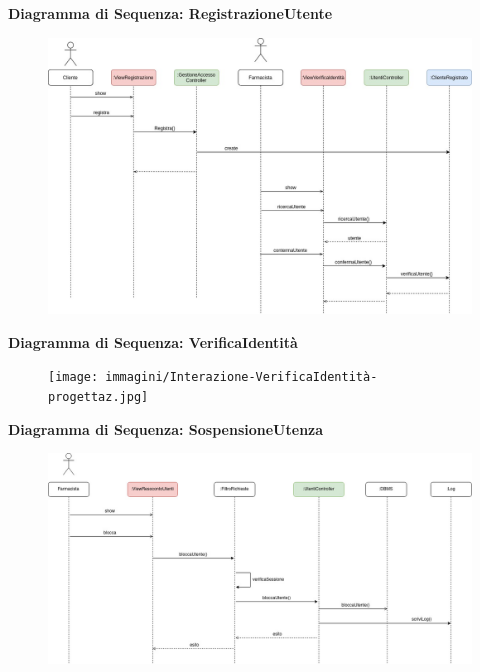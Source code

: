 \newpage

\textbf{Diagramma di Sequenza: RegistrazioneUtente}

\begin{figure}[h!]
    \begin{center}
        \includegraphics[width=\textwidth]{immagini/Interazione-RegistrazioneUtente.jpg}
    \end{center}
\end{figure}

\newpage
\textbf{Diagramma di Sequenza: VerificaIdentità}

\begin{figure}[h!]
    \begin{center}
        \texttt{[image: immagini/Interazione-VerificaIdentità-progettaz.jpg]}
    \end{center}
\end{figure}

\textbf{Diagramma di Sequenza: SospensioneUtenza}
\begin{figure}[h!]
    \begin{center}
        \includegraphics[width=\textwidth]{immagini/Interazione-SospensioneUtenza-progettaz.jpg}
    \end{center}
\end{figure}


